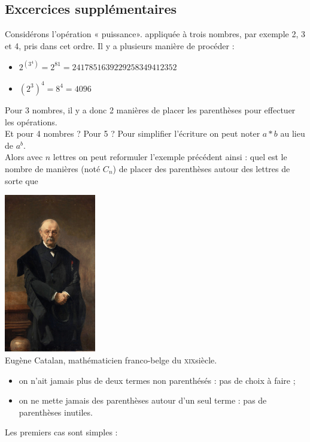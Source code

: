 \documentclass[10pt,firamath,cours]{nsi}
\begin{document}
\subsection*{Excercices supplémentaires}

\begin{exercice}


		Considérons l'opération « puissance». appliquée à trois nombres, par exemple 2, 3 et 4, pris dans cet ordre. Il y a plusieurs manière de
		procéder :
		\begin{itemize}
			\item	$2^{(3^4)}=2^{81}=2 417 851 639 229 258 349 412 352$
			\item 	$(2^3)^4 = 8^4=4096$
		\end{itemize}
		Pour 3 nombres, il y a donc 2 manières de placer les parenthèses pour effectuer les opérations.\\
		Et pour 4 nombres ? Pour 5 ?
		Pour simplifier l’écriture on peut noter $a*b$ au lieu de $a^b$. \\
		Alors avec $n$ lettres on peut reformuler l’exemple précédent ainsi
		: quel est le nombre de manières (noté $C_n$) de placer des parenthèses autour des lettres de sorte que

		\begin{center}
			\includegraphics[width=4cm]{img/catalan}\\\scriptsize
			Eugène Catalan, mathématicien franco-belge du \textsc{xix}\eme siècle.
		\end{center}
	
	\begin{itemize}
		\item 	on n'ait jamais plus de deux termes non parenthésés : pas de choix à faire ;
		\item 	on ne mette jamais des parenthèses autour d’un seul terme : pas de parenthèses inutiles.
	\end{itemize}
	Les premiers cas sont simples :
	

\end{exercice}
\end{document}
